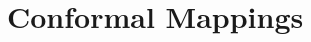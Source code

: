 \documentclass[../../main.tex]{subfiles}
\begin{document}
\chapter{Conformal Mappings}
\end{document}
